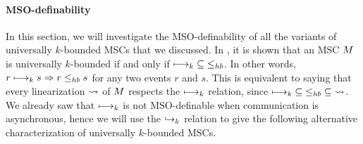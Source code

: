 


\paragraph*{MSO-definability}

In this section, we will investigate the MSO-definability of all the variants of universally $k$-bounded MSCs that we discussed.
In \cite{DBLP:conf/fossacs/LohreyM02}, it is shown that an MSC $M$ is universally $k$-bounded if and only if $\longmapsto_k \;\subseteq\; \leq_{hb}$. In other words, $r \longmapsto_k s \Rightarrow r \leq_{hb} s$ for any two events $r$ and $s$. This is equivalent to saying that every linearization $\rightsquigarrow$ of $M$ respects the $\longmapsto_k$ relation, since $\longmapsto_k \;\subseteq\; \leq_{hb} \;\subseteq\; \rightsquigarrow$. We already saw that $\longmapsto_k$ is not MSO-definable when communication is asynchronous, hence we will use the $\hookrightarrow_{k}$ relation to give the following alternative characterization of universally $k$-bounded MSCs.

